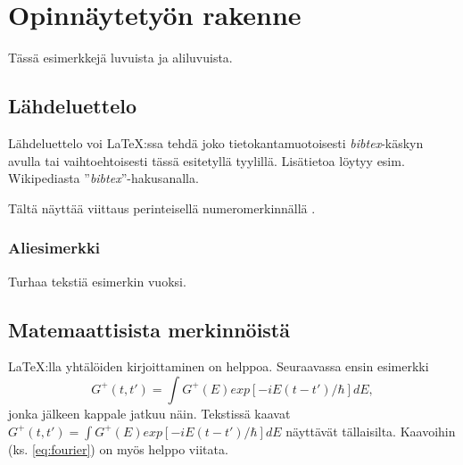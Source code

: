 \chapter{Opinnäytetyön rakenne}

Tässä esimerkkejä luvuista ja aliluvuista.

\section{Lähdeluettelo}

Lähdeluettelo voi \LaTeX:ssa tehdä joko tietokantamuotoisesti
\textit{bibtex}-käskyn avulla tai vaihtoehtoisesti tässä esitetyllä tyylillä.
Lisätietoa löytyy esim. Wikipediasta ''\textit{bibtex}''-hakusanalla.

Tältä näyttää viittaus perinteisellä numeromerkinnällä \cite{Hirs,Mittelbach}.

%
%

\subsection{Aliesimerkki}

Turhaa tekstiä esimerkin vuoksi.

\section{Matemaattisista merkinnöistä}

\LaTeX:lla yhtälöiden kirjoittaminen on helppoa. Seuraavassa ensin esimerkki
\begin{equation}
  \label{eq:fourier}
  G^+(t,t')= \int G^+(E) exp[-iE(t-t')/\hbar] dE,
\end{equation}
jonka jälkeen kappale jatkuu näin.
Tekstissä kaavat $G^+(t,t')= \int G^+(E) exp[-iE(t-t')/\hbar] dE$ näyttävät
tällaisilta. Kaavoihin (ks. \ref{eq:fourier}) on myös helppo viitata.

%

